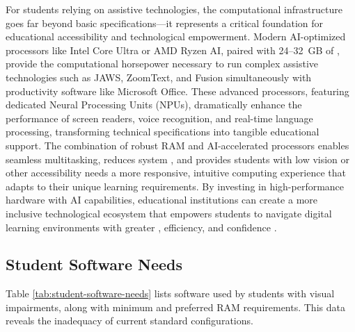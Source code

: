 For students relying on assistive technologies, the computational infrastructure goes far beyond basic  specifications---it represents a critical foundation for educational accessibility and technological empowerment. Modern AI-optimized processors like Intel Core Ultra or AMD Ryzen AI, paired with 24--32~GB of , provide the computational horsepower necessary to run complex assistive technologies such as JAWS, ZoomText, and Fusion simultaneously with productivity software like Microsoft Office. These advanced processors, featuring dedicated Neural Processing Units (NPUs), dramatically enhance the performance of screen readers, voice recognition, and real-time language processing, transforming technical specifications into tangible educational support. The combination of robust RAM and AI-accelerated processors enables seamless multitasking, reduces system , and provides students with low vision or other accessibility needs a more responsive, intuitive computing experience that adapts to their unique learning requirements. By investing in high-performance hardware with AI capabilities, educational institutions can create a more inclusive technological ecosystem that empowers students to navigate digital learning environments with greater , efficiency, and confidence \supercite{EducationalEquityReport2024, AIinAccessibility}.


\subsection{Student Software Needs}\label{student-software-needs}

Table \ref{tab:student-software-needs} lists software used by students with visual impairments, along with minimum and preferred RAM requirements. This data reveals the inadequacy of current standard configurations.

